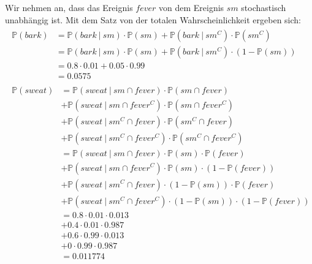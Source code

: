 \documentclass[a4paper]{scrartcl}
\newcommand{\prob}{\mathbb{P}}
\begin{document}
Wir nehmen an, dass das Ereignis $fever$ von dem Ereignis $sm$ stochastisch
unabhängig ist.  Mit dem Satz von der totalen Wahrscheinlichkeit ergeben sich:
\begin{align*}
    \begin{split}
        \prob(bark) &= \prob(bark\ |\ sm) \cdot \prob(sm) +
                       \prob(bark\ |\ sm^C) \cdot \prob(sm^C) \\
                    &= \prob(bark\ |\ sm) \cdot \prob(sm) +
                       \prob(bark\ |\ sm^C) \cdot (1 - \prob(sm)) \\
                    &= \num{0,8} \cdot \num{0,01} +
                       \num{0,05} \cdot \num{0,99} \\
                    &= \num{0,0575}
    \end{split} \\
    \begin{split}
        \prob(sweat) &= \prob(sweat\ |\ sm \cap fever) \cdot
                        \prob(sm \cap fever) \\
                     &+ \prob(sweat\ |\ sm \cap fever^C) \cdot
                        \prob(sm \cap fever^C) \\
                     &+ \prob(sweat\ |\ sm^C \cap fever) \cdot
                        \prob(sm^C \cap fever) \\
                     &+ \prob(sweat\ |\ sm^C \cap fever^C) \cdot
                        \prob(sm^C \cap fever^C) \\
                     &= \prob(sweat\ |\ sm \cap fever) \cdot
                        \prob(sm) \cdot \prob(fever) \\
                     &+ \prob(sweat\ |\ sm \cap fever^C) \cdot
                        \prob(sm) \cdot (1 - \prob(fever)) \\
                     &+ \prob(sweat\ |\ sm^C \cap fever) \cdot
                        (1 - \prob(sm)) \cdot \prob(fever) \\
                     &+ \prob(sweat\ |\ sm^C \cap fever^C) \cdot
                        (1 - \prob(sm)) \cdot (1 - \prob(fever)) \\
                        &= \num{0,8} \cdot
                        \num{0,01} \cdot \num{0,013} \\
                        &+ \num{0,4} \cdot
                        \num{0,01} \cdot \num{0,987} \\
                        &+ \num{0,6} \cdot
                        \num{0,99} \cdot \num{0,013} \\
                        &+ \num{0} \cdot
                        \num{0,99} \cdot \num{0,987} \\
                     &= \num{0.011774}
    \end{split}
\end{align*}
\end{document}
